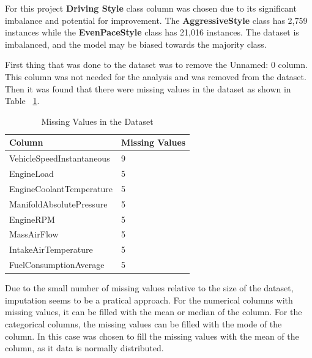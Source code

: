 For this project \textbf{Driving Style} class column was chosen due to its significant imbalance and potential for improvement. 
The \textbf{AggressiveStyle} class has 2,759 instances while the \textbf{EvenPaceStyle} class has 21,016 instances. The dataset is imbalanced, 
and the model may be biased towards the majority class. 

First thing that was done to the dataset was to remove the Unnamed: 0 column. This column was not needed for the analysis and was removed from the dataset.
Then it was found that there were missing values in the dataset as shown in Table ~\ref{tab:missing_values}.

\begin{table}[ht]
    \centering
    \label{tab:missing_values}
    \begin{tabular}{|l|l|}
    \hline
    \textbf{Column}                   & \textbf{Missing Values} \\ \hline
    VehicleSpeedInstantaneous         & 9                       \\ \hline
    EngineLoad                        & 5                       \\ \hline
    EngineCoolantTemperature          & 5                       \\ \hline
    ManifoldAbsolutePressure          & 5                       \\ \hline
    EngineRPM                         & 5                       \\ \hline
    MassAirFlow                       & 5                       \\ \hline
    IntakeAirTemperature              & 5                       \\ \hline
    FuelConsumptionAverage            & 5                       \\ \hline
    \end{tabular}
    \caption{Missing Values in the Dataset}
\end{table}

Due to the small number of missing values relative to the size of the dataset, imputation seems to be a pratical approach. For the numerical columns with missing values, it can be filled
with the mean or median of the column. For the categorical columns, the missing values can be filled with the mode of the column.
In this case was chosen to fill the missing values with the mean of the column, as it data is normally distributed.

